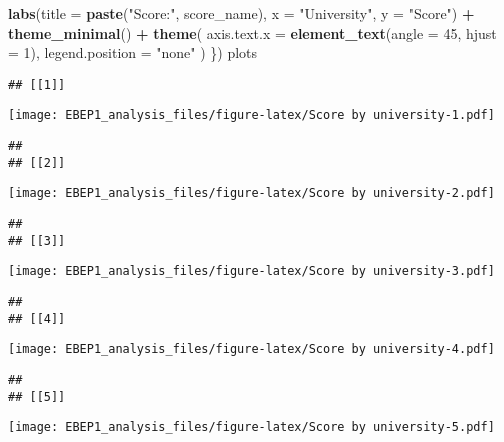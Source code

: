 \documentclass[
]{article}
\newenvironment{Shaded}{\begin{snugshade}}{\end{snugshade}}
\newcommand{\AttributeTok}[1]{\textcolor[rgb]{0.13,0.29,0.53}{#1}}
\newcommand{\DecValTok}[1]{\textcolor[rgb]{0.00,0.00,0.81}{#1}}
\newcommand{\FunctionTok}[1]{\textcolor[rgb]{0.13,0.29,0.53}{\textbf{#1}}}
\newcommand{\NormalTok}[1]{#1}
\newcommand{\SpecialCharTok}[1]{\textcolor[rgb]{0.81,0.36,0.00}{\textbf{#1}}}
\newcommand{\StringTok}[1]{\textcolor[rgb]{0.31,0.60,0.02}{#1}}
\begin{document}
\begin{Shaded}
\begin{Highlighting}[]
    \FunctionTok{labs}\NormalTok{(}\AttributeTok{title =} \FunctionTok{paste}\NormalTok{(}\StringTok{"Score:"}\NormalTok{, score\_name),}
         \AttributeTok{x =} \StringTok{"University"}\NormalTok{, }\AttributeTok{y =} \StringTok{"Score"}\NormalTok{) }\SpecialCharTok{+}
    \FunctionTok{theme\_minimal}\NormalTok{() }\SpecialCharTok{+}
    \FunctionTok{theme}\NormalTok{(}
      \AttributeTok{axis.text.x =} \FunctionTok{element\_text}\NormalTok{(}\AttributeTok{angle =} \DecValTok{45}\NormalTok{, }\AttributeTok{hjust =} \DecValTok{1}\NormalTok{),}
      \AttributeTok{legend.position =} \StringTok{"none"}
\NormalTok{    )}
\NormalTok{\})}
\NormalTok{plots}
\end{Highlighting}
\end{Shaded}

\begin{verbatim}
## [[1]]
\end{verbatim}

\texttt{[image: EBEP1\_analysis\_files/figure-latex/Score by university-1.pdf]}

\begin{verbatim}
## 
## [[2]]
\end{verbatim}

\texttt{[image: EBEP1\_analysis\_files/figure-latex/Score by university-2.pdf]}

\begin{verbatim}
## 
## [[3]]
\end{verbatim}

\texttt{[image: EBEP1\_analysis\_files/figure-latex/Score by university-3.pdf]}

\begin{verbatim}
## 
## [[4]]
\end{verbatim}

\texttt{[image: EBEP1\_analysis\_files/figure-latex/Score by university-4.pdf]}

\begin{verbatim}
## 
## [[5]]
\end{verbatim}

\texttt{[image: EBEP1\_analysis\_files/figure-latex/Score by university-5.pdf]}
\end{document}
